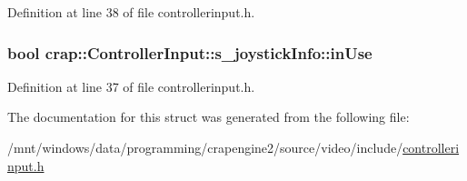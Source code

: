 Definition at line 38 of file controllerinput.\+h.

\hypertarget{structcrap_1_1_controller_input_1_1s__joystick_info_ade0a86285594da76150e65af90aa118b}{}
\subsubsection[{in\+Use}]{\setlength{\rightskip}{0pt plus 5cm}bool crap\+::\+Controller\+Input\+::s\+\_\+joystick\+Info\+::in\+Use}\label{structcrap_1_1_controller_input_1_1s__joystick_info_ade0a86285594da76150e65af90aa118b}


Definition at line 37 of file controllerinput.\+h.



The documentation for this struct was generated from the following file\+:\begin{DoxyCompactItemize}
\item 
/mnt/windows/data/programming/crapengine2/source/video/include/\hyperlink{controllerinput_8h}{controllerinput.\+h}\end{DoxyCompactItemize}
